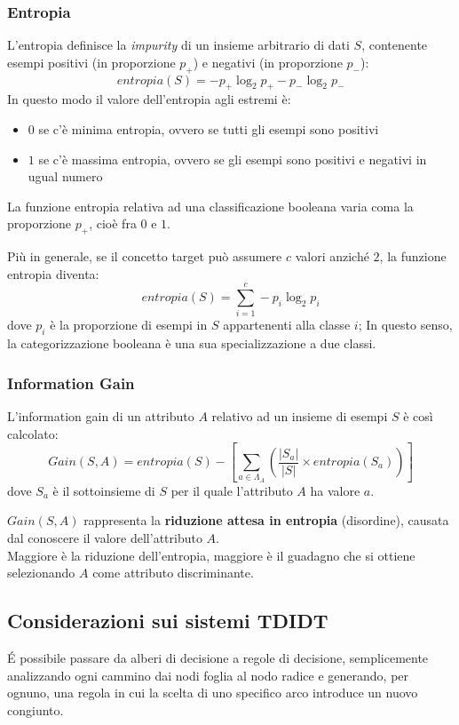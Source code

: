 \documentclass[preprint]{acm_proc_article-sp}
\begin{document}
\subsubsection{Entropia}
\label{entropia}
L'entropia definisce la \textit{impurity} di un insieme arbitrario di dati $S$, contenente esempi positivi (in proporzione $p_+$) e negativi (in proporzione $p_-$):
\[ entropia(S) = -p_+ \log_2p_+ - p_- \log_2p_- \]
In questo modo il valore dell'entropia agli estremi è:
\begin{itemize}
\item $0$ se c'è minima entropia, ovvero se tutti gli esempi sono positivi
\item $1$ se c'è massima entropia, ovvero se gli esempi sono positivi e negativi in ugual numero
\end{itemize}
La funzione entropia relativa ad una classificazione booleana varia coma la proporzione $p_+$, cioè fra $0$ e $1$.

Più in generale, se il concetto target può assumere $c$ valori anziché $2$, la funzione entropia diventa:
\[ entropia(S) = \sum_{i=1}^c -p_i \log_2p_i \]
dove $p_i$ è la proporzione di esempi in $S$ appartenenti alla classe $i$; In questo senso, la categorizzazione booleana è una sua specializzazione a due classi.

\subsubsection{Information Gain}
\label{information-gain}
L'information gain di un attributo $A$ relativo ad un insieme di esempi $S$ è così calcolato:
\[Gain(S,A) = entropia(S) - \left[ \sum_{a \in \Lambda_A} \left( \frac{|S_a|}{|S|} \times entropia(S_a) \right) \right] \]
dove $S_a$ è il sottoinsieme di $S$ per il quale l'attributo $A$ ha valore $a$.

$Gain(S,A)$ rappresenta la \textbf{riduzione attesa in entropia} (disordine), causata dal conoscere il valore dell'attributo $A$.\\
Maggiore è la riduzione dell'entropia, maggiore è il guadagno che si ottiene selezionando $A$ come attributo discriminante.

\subsection{Considerazioni sui sistemi TDIDT}
\'E possibile passare da alberi di decisione a regole di decisione, semplicemente analizzando ogni cammino dai nodi foglia al nodo radice e generando, per ognuno, una regola in cui la scelta di uno specifico arco introduce un nuovo congiunto.
\end{document}
